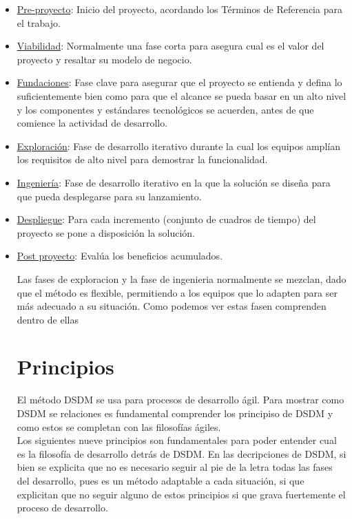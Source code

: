 \documentclass[12pt,a4paper]{article}
\begin{document}
\begin{itemize}
	\item \underline{Pre-proyecto}: Inicio del proyecto, acordando los Términos de Referencia para el trabajo.
	\item \underline{Viabilidad}:
	Normalmente una fase corta para asegura cual es el valor del proyecto y resaltar su modelo de negocio.
	\item \underline{Fundaciones}: Fase clave para asegurar que el proyecto se entienda y defina lo suficientemente bien como para que el alcance se pueda basar en un alto nivel y los componentes y estándares tecnológicos se acuerden, antes de que comience la actividad de desarrollo.

\item \underline{Exploración}: Fase de desarrollo iterativo durante la cual los equipos amplían los requisitos de alto nivel para demostrar la funcionalidad.

\item \underline{Ingeniería}: Fase de desarrollo iterativo en la que la solución se diseña para que pueda desplegarse para su lanzamiento.

\item \underline{Despliegue}: Para cada incremento (conjunto de cuadros de tiempo) del proyecto se pone a disposición la solución.

 \item \underline{Post proyecto}: Evalúa los beneficios acumulados.

Las fases de exploracion y la fase de ingenieria normalmente se mezclan, dado que el método es flexible, permitiendo a los equipos que lo adapten para ser más adecuado a su situación. Como podemos ver estas fasen comprenden dentro de ellas 


\section{Principios}

El método DSDM se usa para procesos de desarrollo ágil. Para mostrar como DSDM se relaciones es fundamental comprender los principiso de DSDM y como estos se completan con las filosofías ágiles.\\

Los siguientes nueve principios son fundamentales para poder entender cual es la filosofía de desarrollo detrás de DSDM. En las decripciones de DSDM, si bien se explicita que no es necesario seguir al pie de la letra todas las fases del desarrollo, pues es un método adaptable a cada situación, si que explicitan que no seguir alguno de estos principios si que grava fuertemente el proceso de desarrollo.


\end{itemize}
\end{document}
